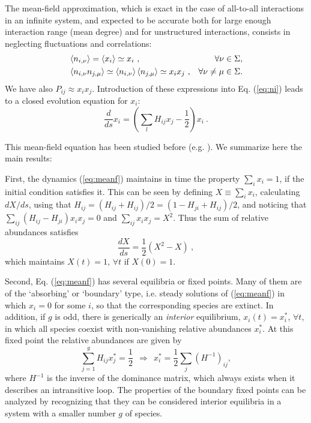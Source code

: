 The mean-field approximation, which is exact in the case of
all-to-all interactions in an infinite system, and expected to
be accurate both for large enough interaction range (mean
degree) and for unstructured interactions, consists in
neglecting fluctuations and correlations:
\begin{eqnarray}
& \left\langle n_{i,\nu}\right\rangle=\left\langle x_i\right\rangle  \simeq x_i\ ,  & \forall \nu\in \Sigma, \\
& \left\langle n_{i,\nu} n_{j,\mu}\right\rangle   \simeq \left\langle n_{i,\nu}\right\rangle \left\langle n_{j,\mu}\right\rangle \simeq x_ix_j \ , &  \forall \nu\ne \mu \in \Sigma.
\end{eqnarray}
We have also $P_{ij}\approx x_i x_j$. Introduction of these
expressions into Eq. (\ref{eq:ni}) leads to a closed evolution
equation for $x_i$:
\begin{equation}
  \label{eq:meanf}
  \frac{d}{ds} x_i = \left(\sum_{l}H_{ij}x_j-\frac12\right)x_i \ .
\end{equation}

This mean-field equation has been studied before (e.g.
 \cite{Grilli2017Higher-orderModels}). We summarize here the
main results:

First, the dynamics (\ref{eq:meanf}) maintains in time the
property $\sum_i x_i =1$, if the initial condition satisfies
it. This can be seen by defining $X\equiv \sum_i x_i$,
calculating $dX/ds$, using that $H_{ij}=(H_{ij}+H_{ij})/2 =
(1-H_{ji}+H_{ij})/2$, and noticing that $\sum_{ij}
(H_{ij}-H_{ji})x_i x_j =0$ and $\sum_{ij} x_i x_j =X^2$. Thus
the sum of relative abundances satisfies
\begin{equation}
\label{eq:sumdynamics}
\frac{dX}{ds} = \frac12 (X^2 - X) \ ,
\end{equation}
which maintains $X(t)=1$, $\forall t$ if
$X(0)=1$.

Second, Eq. (\ref{eq:meanf}) has several equilibria or fixed
points. Many of them are of the `absorbing' or `boundary' type,
i.e. steady solutions of (\ref{eq:meanf}) in which $x_i=0$ for
some $i$, so that the corresponding species are extinct. In
addition, if $g$ is odd, there is generically
 \cite{Grilli2017Higher-orderModels} an \textit{interior}
equilibrium, $x_i(t)=x_i^*$, $\forall t$, in which all species
coexist with non-vanishing relative abundances $x_i^*$. At this
fixed point the relative abundances are given by
\begin{equation}
  \label{eq:sts}
  \sum_{j=1}^g H_{ij} x_j^* =\frac12 \ \ \Rightarrow \ \
  x_i^*=\frac12 \sum_j (H^{-1})_{ij},
\end{equation}
where $H^{-1}$ is the inverse of the dominance matrix, which
always exists when it describes an intransitive loop. The
properties of the boundary fixed points can be analyzed by
recognizing that they can be considered interior equilibria in
a system with a smaller number $g$ of species.

